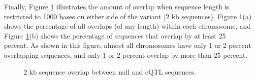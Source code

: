 \documentclass[12pt]{article}
\begin{document}
Finally, Figure \ref{2kbOverlaps} illustrates the amount of overlap when sequence length is restricted to 1000 bases on either side of the variant (2 kb sequences). Figure \ref{2kbOverlaps}(a) shows the percentage of all overlaps (of any length) within each chromosome, and Figure \ref{2kbOverlaps}(b) shows the percentage of sequences that overlap by at least 25 percent. As shown in this figure, almost all chromosomes have only 1 or 2 percent overlapping sequences, and only 1 or 2 percent overlap by more than 25 percent.

\begin{figure}[!htbp]%
\centering
{}%
\qquad
{}
\caption{2 kb sequence overlap between null and eQTL sequences.}\label{2kbOverlaps}%
\end{figure}  
\end{document}
